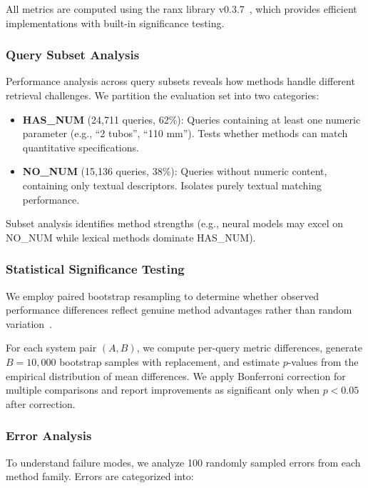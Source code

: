 \documentclass[preprint,12pt]{elsarticle}
\begin{document}
All metrics are computed using the ranx library v0.3.7~\citep{bassani2022ranx}, which provides efficient implementations with built-in significance testing.

\subsubsection{Query Subset Analysis}

Performance analysis across query subsets reveals how methods handle different retrieval challenges. We partition the evaluation set into two categories:

\begin{itemize}
    \item \textbf{HAS\_NUM} (24,711 queries, 62\%): Queries containing at least one numeric parameter (e.g., ``2 tubos'', ``110 mm''). Tests whether methods can match quantitative specifications.
    
    \item \textbf{NO\_NUM} (15,136 queries, 38\%): Queries without numeric content, containing only textual descriptors. Isolates purely textual matching performance.

\end{itemize}

Subset analysis identifies method strengths (e.g., neural models may excel on NO\_NUM while lexical methods dominate HAS\_NUM).

\subsubsection{Statistical Significance Testing}

We employ paired bootstrap resampling to determine whether observed performance differences reflect genuine method advantages rather than random variation~\citep{smucker2007comparison}.

For each system pair $(A, B)$, we compute per-query metric differences, generate $B=10{,}000$ bootstrap samples with replacement, and estimate $p$-values from the empirical distribution of mean differences. We apply Bonferroni correction for multiple comparisons and report improvements as significant only when $p < 0.05$ after correction.

\subsubsection{Error Analysis}

To understand failure modes, we analyze 100 randomly sampled errors from each method family. Errors are categorized into:
\end{document}
